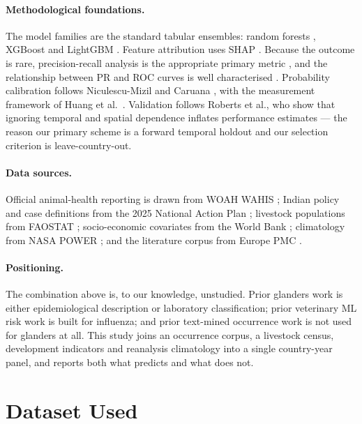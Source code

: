 \documentclass[11pt]{article}
\begin{document}
\paragraph{Methodological foundations.}
The model families are the standard tabular ensembles: random forests \cite{breiman2001},
XGBoost \cite{chen2016} and LightGBM \cite{ke2017}. Feature attribution uses
SHAP \cite{lundberg2017}. Because the outcome is rare, precision-recall analysis is the
appropriate primary metric \cite{saito2015}, and the relationship between PR and ROC
curves is well characterised \cite{davis2006}. Probability calibration follows
Niculescu-Mizil and Caruana \cite{niculescu2005}, with the measurement framework of Huang
et al.\ \cite{huang2020}. Validation follows Roberts et al., who show that ignoring
temporal and spatial dependence inflates performance estimates \cite{roberts2017} --- the
reason our primary scheme is a forward temporal holdout and our selection criterion is
leave-country-out.

\paragraph{Data sources.}
Official animal-health reporting is drawn from WOAH WAHIS \cite{wahis}; Indian policy and
case definitions from the 2025 National Action Plan \cite{dahd2025}; livestock
populations from FAOSTAT \cite{faostat}; socio-economic covariates from the World Bank
\cite{wdi}; climatology from NASA POWER \cite{power}; and the literature corpus from
Europe PMC \cite{europepmc}.

\paragraph{Positioning.}
The combination above is, to our knowledge, unstudied. Prior glanders work is either
epidemiological description or laboratory classification; prior veterinary ML risk work is
built for influenza; and prior text-mined occurrence work is not used for glanders at all.
This study joins an occurrence corpus, a livestock census, development indicators and
reanalysis climatology into a single country-year panel, and reports both what predicts and
what does not.


\section{Dataset Used}
\end{document}
